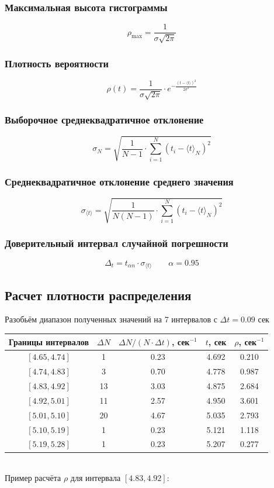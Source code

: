 \documentclass[12pt,a4paper]{article}
\begin{document}
\subsubsection{Максимальная высота гистограммы}
$$\rho_{\max}=\frac{1}{\sigma \sqrt{2\pi}}$$
\subsubsection{Плотность вероятности}
$$\rho(t)=\frac{1}{\sigma\sqrt{2\pi}}\cdot e^{-\frac{(t-\langle t\rangle)^2}{2\sigma^2}}$$
\subsubsection{Выборочное среднеквадратичное отклонение}
$$\sigma_N=\sqrt{\frac{1}{N-1}\cdot\sum_{i=1}^N(t_i - \langle t\rangle_N)^2}$$
\subsubsection{Среднеквадратичное отклонение среднего значения}
$$\sigma_{\langle t\rangle}=\sqrt{\frac{1}{N(N-1)}\cdot\sum_{i=1}^N(t_i - \langle t\rangle_N)^2}$$
\subsubsection{Доверительный интервал случайной погрешности}
$$\Delta_t=t_{\alpha n}\cdot\sigma_{\langle t\rangle}\qquad\alpha=0.95$$
\subsection{Расчет плотности распределения}
Разобьём диапазон полученных значений на 7 интервалов с $\Delta t=0.09$ сек\\
\hfill\break
\begin{tabular}{|c|c|c|c|c|}
    \hline
    Границы интервалов & $\Delta N$ & $\Delta N / (N \cdot \Delta t)$, сек$^{-1}$ & $t$, сек & $\rho$, сек$^{-1}$ \\
    \hline
    $[4.65, 4.74]$ & 1 & 0.23 & 4.692 & 0.210 \\
    \hline
    $[4.74, 4.83]$ & 3 & 0.70 & 4.778 & 0.987 \\
    \hline
    $[4.83, 4.92]$ & 13 & 3.03 & 4.875 & 2.684 \\
    \hline
    $[4.92, 5.01]$ & 11 & 2.57 & 4.950 & 3.601 \\
    \hline
    $[5.01, 5.10]$ & 20 & 4.67 & 5.035 & 2.793 \\
    \hline
    $[5.10, 5.19]$ & 1 & 0.23 & 5.121 & 1.118 \\
    \hline
    $[5.19, 5.28]$ & 1 & 0.23 & 5.207 & 0.277 \\
    \hline
\end{tabular} \\
\hfill\break
Пример расчёта $\rho$ для интервала $[4.83, 4.92]$: \\
\end{document}

